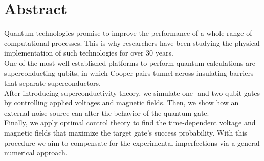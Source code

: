 \section*{Abstract}
Quantum technologies promise to improve the performance of a whole range of computational processes. This is why researchers have been studying the physical implementation of such technologies for over 30 years.\\
One of the most well-established platforms to perform quantum calculations are superconducting qubits, in which Cooper pairs tunnel across insulating barriers that separate superconductors.\\
After introducing superconductivity theory, we simulate one- and two-qubit gates by controlling applied voltages and magnetic fields. Then, we show how an external noise source can alter the behavior of the quantum gate.\\
Finally, we apply optimal control theory to find the time-dependent voltage and magnetic fields that maximize the target gate's success probability. With this procedure we aim to compensate for the experimental imperfections via a general numerical approach.\\
